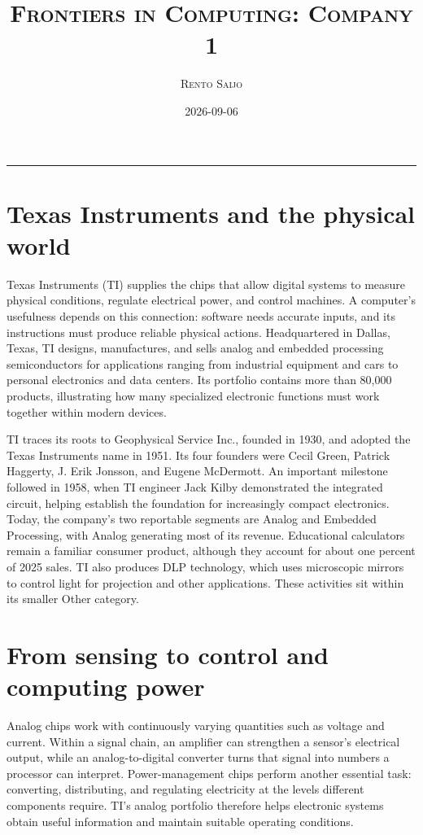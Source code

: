 \documentclass[10pt]{article}
\title{\Large\textsc{Frontiers in Computing: Company 1}}
\author{\large\textsc{Rento Saijo}}
\date{2026-09-06}
\begin{document}
\maketitle
\thispagestyle{fancy}
\vspace{-1em}\rule{\linewidth}{0.6pt}\vspace{0.5em}

\section*{Texas Instruments and the physical world}

Texas Instruments (TI) supplies the chips that allow digital systems to measure physical conditions, regulate electrical power, and control machines. A computer's usefulness depends on this connection: software needs accurate inputs, and its instructions must produce reliable physical actions. Headquartered in Dallas, Texas, TI designs, manufactures, and sells analog and embedded processing semiconductors for applications ranging from industrial equipment and cars to personal electronics and data centers. Its portfolio contains more than 80,000 products, illustrating how many specialized electronic functions must work together within modern devices.~\cite{ti-about}

TI traces its roots to Geophysical Service Inc., founded in 1930, and adopted the Texas Instruments name in 1951. Its four founders were Cecil Green, Patrick Haggerty, J. Erik Jonsson, and Eugene McDermott. An important milestone followed in 1958, when TI engineer Jack Kilby demonstrated the integrated circuit, helping establish the foundation for increasingly compact electronics.~\cite{ti-about,ti-history} Today, the company's two reportable segments are Analog and Embedded Processing, with Analog generating most of its revenue. Educational calculators remain a familiar consumer product, although they account for about one percent of 2025 sales. TI also produces DLP technology, which uses microscopic mirrors to control light for projection and other applications. These activities sit within its smaller Other category.~\cite{ti-annual,ti-dlp}

\section*{From sensing to control and computing power}

Analog chips work with continuously varying quantities such as voltage and current. Within a signal chain, an amplifier can strengthen a sensor's electrical output, while an analog-to-digital converter turns that signal into numbers a processor can interpret. Power-management chips perform another essential task: converting, distributing, and regulating electricity at the levels different components require. TI's analog portfolio therefore helps electronic systems obtain useful information and maintain suitable operating conditions.~\cite{ti-annual}
\end{document}
